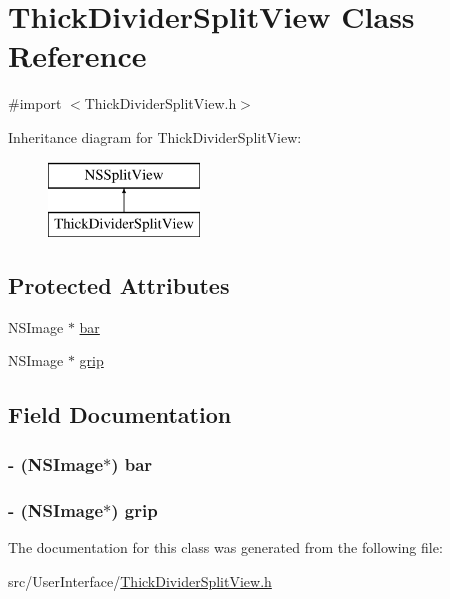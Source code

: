 \hypertarget{interface_thick_divider_split_view}{\section{Thick\-Divider\-Split\-View Class Reference}
\label{interface_thick_divider_split_view}
}


{\ttfamily \#import $<$Thick\-Divider\-Split\-View.\-h$>$}

Inheritance diagram for Thick\-Divider\-Split\-View\-:\begin{figure}[H]
\begin{center}
\leavevmode
\includegraphics[height=2.000000cm]{interface_thick_divider_split_view}
\end{center}
\end{figure}
\subsection*{Protected Attributes}
\begin{DoxyCompactItemize}
\item 
N\-S\-Image $\ast$ \hyperlink{interface_thick_divider_split_view_ab10c09d6bb118c5c49ffd168f5ffd294}{bar}
\item 
N\-S\-Image $\ast$ \hyperlink{interface_thick_divider_split_view_ac5e83c39d930bdbf70f3cf4e010600d2}{grip}
\end{DoxyCompactItemize}


\subsection{Field Documentation}
\hypertarget{interface_thick_divider_split_view_ab10c09d6bb118c5c49ffd168f5ffd294}{
\subsubsection[{bar}]{\setlength{\rightskip}{0pt plus 5cm}-\/ (N\-S\-Image$\ast$) bar\hspace{0.3cm}{\ttfamily [protected]}}}\label{interface_thick_divider_split_view_ab10c09d6bb118c5c49ffd168f5ffd294}
\hypertarget{interface_thick_divider_split_view_ac5e83c39d930bdbf70f3cf4e010600d2}{
\subsubsection[{grip}]{\setlength{\rightskip}{0pt plus 5cm}-\/ (N\-S\-Image$\ast$) grip\hspace{0.3cm}{\ttfamily [protected]}}}\label{interface_thick_divider_split_view_ac5e83c39d930bdbf70f3cf4e010600d2}


The documentation for this class was generated from the following file\-:\begin{DoxyCompactItemize}
\item 
src/\-User\-Interface/\hyperlink{_thick_divider_split_view_8h}{Thick\-Divider\-Split\-View.\-h}\end{DoxyCompactItemize}

